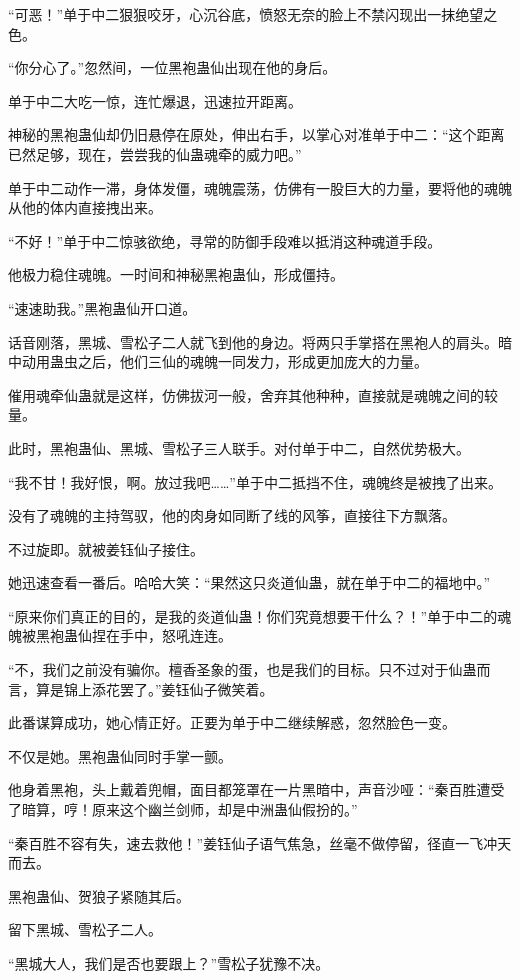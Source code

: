 \begin{this_body}
“可恶！”单于中二狠狠咬牙，心沉谷底，愤怒无奈的脸上不禁闪现出一抹绝望之色。

“你分心了。”忽然间，一位黑袍蛊仙出现在他的身后。

单于中二大吃一惊，连忙爆退，迅速拉开距离。

神秘的黑袍蛊仙却仍旧悬停在原处，伸出右手，以掌心对准单于中二：“这个距离已然足够，现在，尝尝我的仙蛊魂牵的威力吧。”

单于中二动作一滞，身体发僵，魂魄震荡，仿佛有一股巨大的力量，要将他的魂魄从他的体内直接拽出来。

“不好！”单于中二惊骇欲绝，寻常的防御手段难以抵消这种魂道手段。

他极力稳住魂魄。一时间和神秘黑袍蛊仙，形成僵持。

“速速助我。”黑袍蛊仙开口道。

话音刚落，黑城、雪松子二人就飞到他的身边。将两只手掌搭在黑袍人的肩头。暗中动用蛊虫之后，他们三仙的魂魄一同发力，形成更加庞大的力量。

催用魂牵仙蛊就是这样，仿佛拔河一般，舍弃其他种种，直接就是魂魄之间的较量。

此时，黑袍蛊仙、黑城、雪松子三人联手。对付单于中二，自然优势极大。

“我不甘！我好恨，啊。放过我吧……”单于中二抵挡不住，魂魄终是被拽了出来。

没有了魂魄的主持驾驭，他的肉身如同断了线的风筝，直接往下方飘落。

不过旋即。就被姜钰仙子接住。

她迅速查看一番后。哈哈大笑：“果然这只炎道仙蛊，就在单于中二的福地中。”

“原来你们真正的目的，是我的炎道仙蛊！你们究竟想要干什么？！”单于中二的魂魄被黑袍蛊仙捏在手中，怒吼连连。

“不，我们之前没有骗你。檀香圣象的蛋，也是我们的目标。只不过对于仙蛊而言，算是锦上添花罢了。”姜钰仙子微笑着。

此番谋算成功，她心情正好。正要为单于中二继续解惑，忽然脸色一变。

不仅是她。黑袍蛊仙同时手掌一颤。

他身着黑袍，头上戴着兜帽，面目都笼罩在一片黑暗中，声音沙哑：“秦百胜遭受了暗算，哼！原来这个幽兰剑师，却是中洲蛊仙假扮的。”

“秦百胜不容有失，速去救他！”姜钰仙子语气焦急，丝毫不做停留，径直一飞冲天而去。

黑袍蛊仙、贺狼子紧随其后。

留下黑城、雪松子二人。

“黑城大人，我们是否也要跟上？”雪松子犹豫不决。


\end{this_body}
